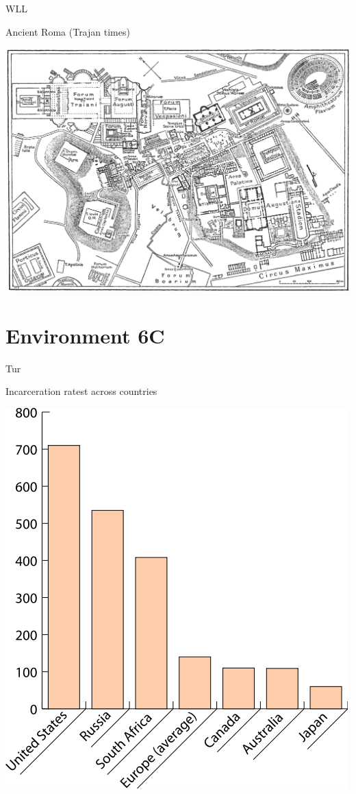 \begin{map}{W}{LL}
\caption{Ancient Roma  (Trajan times)}
\label{map:roma}
\includegraphics[width=\chartwidth,height=\chartheight]{Rome}
\end{map}


\section{Environment 6C}

\lipsum[1-4]

\begin{map}{T}{ur}
\caption{Incarceration ratest across countries}
\label{chart:incarceration}
\includegraphics[width=\chartwidth,height=\chartheight]{incarceration}  
\end{map}

